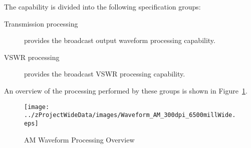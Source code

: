 The \ThisSys \ThisSegment \AM capability is divided into the following specification groups:
\begin{description}
	\item[Transmission processing] provides the \AM broadcast output waveform processing capability.%
	\item[VSWR processing]  provides the \AM broadcast VSWR processing capability.%
\end{description}
An overview of the processing performed by these groups is shown in Figure~\ref{fig:AM_Waveform_Processing}.
\begin{figure}[htbp]
	\centering
		\texttt{[image: ../zProjectWideData/images/Waveform\_AM\_300dpi\_6500millWide.eps]}
	\caption[AM Waveform Processing Overview]{AM Waveform Processing Overview}
	\label{fig:AM_Waveform_Processing}
\end{figure}
\newpage
%
%
%

